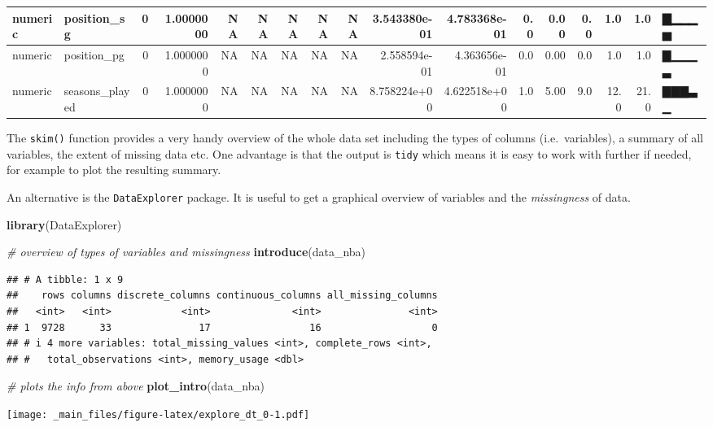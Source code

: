 \documentclass[
]{book}
\newenvironment{Shaded}{\begin{snugshade}}{\end{snugshade}}
\newcommand{\CommentTok}[1]{\textcolor[rgb]{0.56,0.35,0.01}{\textit{#1}}}
\newcommand{\FunctionTok}[1]{\textcolor[rgb]{0.13,0.29,0.53}{\textbf{#1}}}
\newcommand{\NormalTok}[1]{#1}
\begin{document}
\begin{tabular}{l|l|r|r|r|r|r|r|r|r|r|r|r|r|r|r|l}
\hline
numeric & position\_sg & 0 & 1.0000000 & NA & NA & NA & NA & NA & 3.543380e-01 & 4.783368e-01 & 0.0 & 0.00 & 0.0 & 1.0 & 1.0 & ▇▁▁▁▅\\
\hline
numeric & position\_pg & 0 & 1.0000000 & NA & NA & NA & NA & NA & 2.558594e-01 & 4.363656e-01 & 0.0 & 0.00 & 0.0 & 1.0 & 1.0 & ▇▁▁▁▃\\
\hline
numeric & seasons\_played & 0 & 1.0000000 & NA & NA & NA & NA & NA & 8.758224e+00 & 4.622518e+00 & 1.0 & 5.00 & 9.0 & 12.0 & 21.0 & ▇▇▇▃▁\\
\hline
\end{tabular}

The \texttt{skim()} function provides a very handy overview of the whole data set including the types of columns (i.e.~variables), a summary of all variables, the extent of missing data etc. One advantage is that the output is \texttt{tidy} which means it is easy to work with further if needed, for example to plot the resulting summary.

An alternative is the \texttt{DataExplorer} package. It is useful to get a graphical overview of variables and the \emph{missingness} of data.

\begin{Shaded}
\begin{Highlighting}[]
\FunctionTok{library}\NormalTok{(DataExplorer)}

\CommentTok{\# overview of types of variables and missingness}
\FunctionTok{introduce}\NormalTok{(data\_nba)}
\end{Highlighting}
\end{Shaded}

\begin{verbatim}
## # A tibble: 1 x 9
##    rows columns discrete_columns continuous_columns all_missing_columns
##   <int>   <int>            <int>              <int>               <int>
## 1  9728      33               17                 16                   0
## # i 4 more variables: total_missing_values <int>, complete_rows <int>,
## #   total_observations <int>, memory_usage <dbl>
\end{verbatim}

\begin{Shaded}
\begin{Highlighting}[]
\CommentTok{\# plots the info from above}
\FunctionTok{plot\_intro}\NormalTok{(data\_nba)}
\end{Highlighting}
\end{Shaded}

\texttt{[image: \_main\_files/figure-latex/explore\_dt\_0-1.pdf]}
\end{document}
